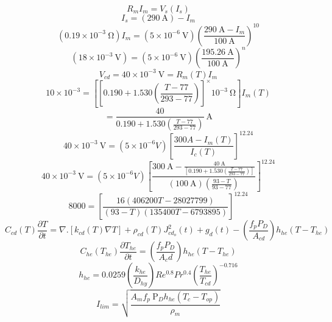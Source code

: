 \begin{equation}%
R_mI_m=V_s(I_s)
\end{equation}
\begin{equation}%
I_s=(290\ \mathrm{A})-I_m
\end{equation}
\begin{equation}%
(0.19\times10^{-3}\ \mathrm{\Omega})I_m=(5\times10^{-6}\ \mathrm{V})(\frac{290\ \mathrm {A}-I_m}{100\ \mathrm{A}})^{10}
\end{equation}
\begin{equation}%
(18\times10^{-3}\ \mathrm{V})=(5\times10^{-6}\ \mathrm{V})(\frac{195.26\ \mathrm{A}}{100\ \mathrm{A}})^n
\end{equation}
\begin{equation}%
V_{cd}=40\times10^{-3}\ \mathrm{V}=R_m(T)I_m
\end{equation}
\begin{equation}%
10\times10^{-3}=[{[0.190+1.530(\frac{T-77}{293-77})]^\times10^{-3}\ \mathrm{\Omega}}]I_m(T)
\end{equation}
\begin{equation}%
\end{equation}
\begin{equation}%
=\frac{40}{0.190+1.530(\frac{T-77}{293-77})}\ \mathrm{A}
\end{equation}
\begin{equation}%
40\times10^{-3}\ \mathrm{V}=(5\times10^{-6}V)[\frac{300A-I_m(T)}{I_c(T)}]^{12.24}
\end{equation}
\begin{equation}%
40\times10^{-3}\ \mathrm{V}=(5\times10^{-6}V)[\frac{300\ \mathrm{A}-\frac{40\ \mathrm{A}}{[0.190+1.530(\frac{T-77}{293-77})]}}{(100\ \mathrm{A})(\frac{93-T}{93-77})}]^{12.24}
\end{equation}
\begin{equation}%
8000=[\frac{16(406200T-28027799)}{(93-T)(135400T-6793895)}]^{12.24}
\end{equation}
\begin{equation}%
C_{cd}(T)\frac{\partial T}{\partial t}=\nabla.[k_{cd}(T)\nabla T]+\rho_{cd}(T)J_{cd_o}^2(t)+g_d(t)-(\frac{f_pP_D}{A_{cd}})h_{he}(T-T_{he})
\end{equation}
\begin{equation}%
C_{he}(T_{he})\frac{\partial T_{he}}{\partial t}=(\frac{f_{p}P_D}{A_cd})h_{he}(T-T_{he})
\end{equation}
\begin{equation}%
h_{he}=0.0259(\frac{k_{he}}{D_{hy}})Re^{0.8}Pr^{0.4}(\frac{T_{he}}{T_{cd}})^{-0.716}
\end{equation}
\begin{equation}%
I_{lim}=\sqrt{\frac{A_mf_p\ \mathrm{P}_Dh_{he}(T_c-T_{op})}{\rho_m}}
\end{equation}

